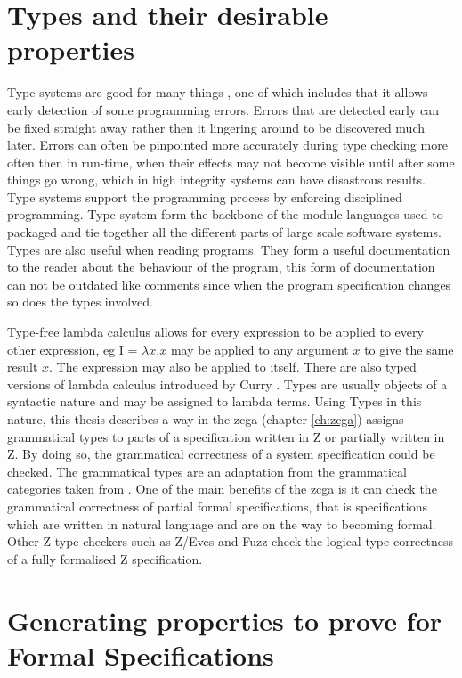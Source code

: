 \section{Types and their desirable properties}

Type systems are good for many things \cite{pierce}, one of which includes that it allows early detection of some programming errors. Errors that are detected early can be fixed straight away rather then it lingering around to be discovered much later. Errors can often be pinpointed more accurately during type checking more often then in run-time, when their effects may not become visible until after some things go wrong, which in high integrity systems can have disastrous results. Type systems support the programming process by enforcing disciplined programming. Type system form the backbone of the module languages used to packaged and tie together all the different parts of large scale software systems. Types are also useful when reading programs. They form a useful documentation to the reader about the behaviour of the program, this form of documentation can not be outdated like comments since when the program specification changes so does the types involved.

Type-free lambda calculus \cite{bar93} allows for every expression to be applied to every other expression, eg I = $\lambda x.x$ may be applied to any argument $x$ to give the same result $x$. The expression may also be applied to itself. There are also typed versions of lambda calculus introduced by Curry \cite{cu34}. Types are usually objects of a syntactic nature and may be assigned to lambda terms. Using Types in this nature, this thesis describes a way in the \gls{zcga} (chapter \ref{ch:zcga}) assigns grammatical types to parts of a specification written in Z or partially written in Z. By doing so, the grammatical correctness of a system specification could be checked. The grammatical types are an adaptation from the grammatical categories taken from \cite{wtt}. One of the main benefits of the \gls{zcga} is it can check the grammatical correctness of partial formal specifications, that is specifications which are written in natural language and are on the way to becoming formal. Other Z type checkers such as Z/Eves \cite{Saaltink99thez/eves} and Fuzz \cite{spiveyfuzz} check the logical type correctness of a fully formalised Z specification.

\section{Generating properties to prove for Formal Specifications}


